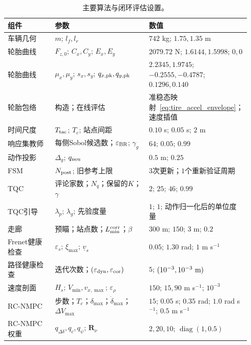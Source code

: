 \documentclass[final,5p,twocolumn]{elsarticle}
\begin{document}
\begin{table}[!tbp]
\centering
\scriptsize
\setlength{\tabcolsep}{2.0pt}
\renewcommand{\arraystretch}{0.95}
\caption{主要算法与闭环评估设置。}
\label{tab:setup_params}
\begin{tabular}{@{}p{0.21\linewidth}p{0.43\linewidth}p{0.30\linewidth}@{}}
\toprule
组件 & 参数 & 数值 \\
\midrule
车辆几何 & \(m\); \(l_f,l_r\) & \(742\) kg; \(1.75,1.35\) m \\
轮胎曲线 & \(F_{z,0}\); \(C_x,C_y\); \(E_x,E_y\) &
\(2079.72\) N; \(1.6144,1.5998\); \(0,0\) \\
轮胎曲线 & \(\mu_x,\mu_y\); \(s_x,s_y\); \(q_{x,\rm pk},q_{y,\rm pk}\) &
\(2.2345,1.9745\); \(-0.2555,-0.4787\); \(0.1296,0.140\) \\
轮胎包络 & 构造；在线评估 &
准稳态映射~\eqref{eq:tire_accel_envelope}；速度插值 \\
时间尺度 & \(T_{\rm tac}\); \(T_c\); 站点间距 &
\(0.10\) s; \(0.05\) s; \(2\) m \\
响应集教师 & 每侧Sobol候选数；\(\varepsilon_{\rm BR}\);
\(\gamma_g\) & \(64\); \(0.05\); \(0.99\) \\
动作投影 & \(\Delta_g\); \(q_{\rm neu}\) & \(0.5\) m; \(0.25\) \\
FSM & \(N_{\rm post}\); 旧参考上限 &
\(3\)次更新；\(1\)个重新验证周期 \\
TQC & 评论家数；\(N_q\)；保留的\(K\)；\(\gamma\) &
\(2\); \(25\); \(46\); \(0.99\) \\
TQC引导 & \(\lambda_p\); \(\lambda_g\); 先验度量 &
\(1\); \(1\); 动作归一化后的单位度量 \\
走廊 & 预瞄；站点数；\(L_{\min}^{\rm corr}\)；\(\beta\) &
\(300\) m; \(150\); \(3\) m; \(0.2\) \\
Frenet健康检查 & \(\varepsilon_s\); \(\xi_{\max}\); \(\underline v_s\) &
\(0.05\); \(1.30\) rad; \(1\) m s\(^{-1}\) \\
路径健康检查 & 迭代次数；\((\varepsilon_{\rm dyn},\varepsilon_{\rm cor})\) &
\(5\); \((10^{-3},10^{-3}\ {\rm m})\) \\
速度剖面 & \(H_s\); \(V_{\min},v_{x,\max}\); \(\varepsilon_\rho\) &
\(150\); \(15,90\) m s\(^{-1}\); \(10^{-3}\) \\
RC-NMPC & 步数；\(T_c\)；\(\delta_{\max}\)；\(\dot\delta_{\max}\)；
\(\Delta V_{\max}\) &
\(15\); \(0.05\) s; \(0.35\) rad; \(1.0\) rad s\(^{-1}\);
\(0.5\) m s\(^{-1}\) \\
RC-NMPC权重 & \(q_{\Delta\delta},q_c,q_\psi\); \(\bm R_\nu\) &
\(2,20,10\); \(\operatorname{diag}(1,0.5)\) \\
\bottomrule
\end{tabular}
\end{table}
\end{document}
